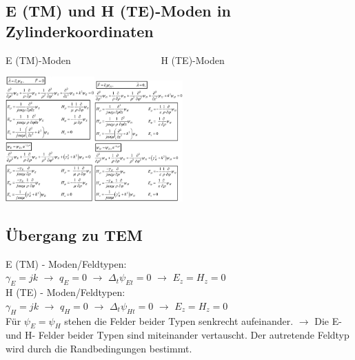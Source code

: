 \documentclass[english]{latex4ei/latex4ei_sheet}
\begin{document}
\begin{sectionbox}
	\subsection{E (TM) und H (TE)-Moden in Zylinderkoordinaten}
	E (TM)-Moden$\quad\quad\quad\quad\quad\quad\quad\quad\quad$ H (TE)-Moden
	\begin{center}\includegraphics[width = 3.4cm]{./img/TM-zylinder.png}\includegraphics[width = 3.4cm]{./img/TE-zylinder.png}\end{center}
\end{sectionbox}


\begin{sectionbox}
	\subsection{Übergang zu TEM}
	E (TM) - Moden/Feldtypen:\\
	$\gamma_E = jk$ $\rightarrow$ $q_E = 0$ $\rightarrow$ $\Delta_t\psi_{Et} = 0$ $\rightarrow$ $E_z = H_z = 0$\\

	H (TE) - Moden/Feldtypen:\\
	$\gamma_H = jk$ $\rightarrow$ $q_H = 0$ $\rightarrow$ $\Delta_t\psi_{Ht} = 0$ $\rightarrow$ $E_z = H_z = 0$\\
	
	Für $\psi_{E} = \psi_{H}$ stehen die Felder beider Typen senkrecht aufeinander. $\rightarrow$ Die E- und H- Felder beider Typen sind miteinander vertauscht. Der autretende Feldtyp wird durch die Randbedingungen bestimmt.
\end{sectionbox}
\end{document}
